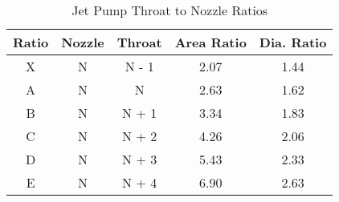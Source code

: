 \begin{table}[h]
\centering
\begin{tabular}{|c|c|c|c|c|}
\hline
Ratio & Nozzle & Throat & Area Ratio & Dia. Ratio \\
\hline
X & N & N - 1 & 2.07 & 1.44 \\
A & N & N & 2.63 & 1.62 \\
B & N & N + 1 & 3.34 & 1.83 \\
C & N & N + 2 & 4.26 & 2.06 \\
D & N & N + 3 & 5.43 & 2.33 \\
E & N & N + 4 & 6.90 & 2.63 \\
\hline
\end{tabular}
\caption{Jet Pump Throat to Nozzle Ratios}
\label{tab:national_jp_ratios}
\end{table}